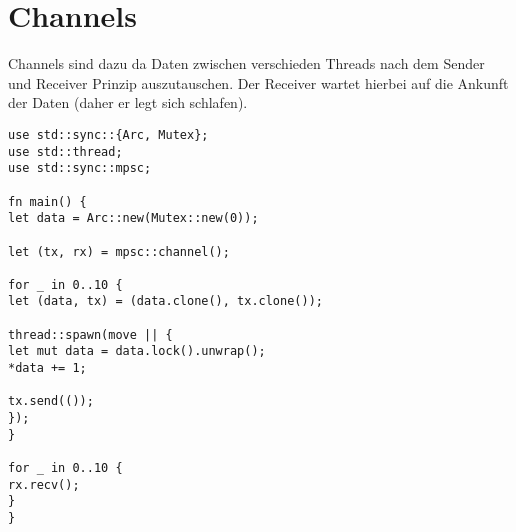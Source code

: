 \section{Channels}

Channels sind dazu da Daten zwischen verschieden Threads nach dem Sender und Receiver Prinzip auszutauschen. Der Receiver wartet hierbei auf die Ankunft der Daten (daher er legt sich schlafen).

\begin{lstlisting}
use std::sync::{Arc, Mutex};
use std::thread;
use std::sync::mpsc;

fn main() {
let data = Arc::new(Mutex::new(0));

let (tx, rx) = mpsc::channel();

for _ in 0..10 {
let (data, tx) = (data.clone(), tx.clone());

thread::spawn(move || {
let mut data = data.lock().unwrap();
*data += 1;

tx.send(());
});
}

for _ in 0..10 {
rx.recv();
}
}
\end{lstlisting}